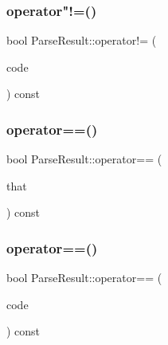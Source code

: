 \mbox{\label{structParseResult_afbe78dd07fd1bc09adb1609dda028ee0}} 
\subsubsection{\texorpdfstring{operator"!=()}{operator!=()}\hspace{0.1cm}{\footnotesize\ttfamily [2/2]}}
{\footnotesize\ttfamily bool Parse\+Result\+::operator!= (\begin{DoxyParamCaption}\item[{\hyperlink{group__RAPIDJSON__ERRORS_ga8d4b32dfc45840bca189ade2bbcb6ba7}{Parse\+Error\+Code}}]{code }\end{DoxyParamCaption}) const\hspace{0.3cm}{\ttfamily [inline]}}

\mbox{\label{structParseResult_a4d98465a5dc6055e367a7ea7089fc73d}} 
\subsubsection{\texorpdfstring{operator==()}{operator==()}\hspace{0.1cm}{\footnotesize\ttfamily [1/2]}}
{\footnotesize\ttfamily bool Parse\+Result\+::operator== (\begin{DoxyParamCaption}\item[{const \hyperlink{structParseResult}{Parse\+Result} \&}]{that }\end{DoxyParamCaption}) const\hspace{0.3cm}{\ttfamily [inline]}}

\mbox{\label{structParseResult_a6de18a7e43013b2defc51d892c2cf90f}} 
\subsubsection{\texorpdfstring{operator==()}{operator==()}\hspace{0.1cm}{\footnotesize\ttfamily [2/2]}}
{\footnotesize\ttfamily bool Parse\+Result\+::operator== (\begin{DoxyParamCaption}\item[{\hyperlink{group__RAPIDJSON__ERRORS_ga8d4b32dfc45840bca189ade2bbcb6ba7}{Parse\+Error\+Code}}]{code }\end{DoxyParamCaption}) const\hspace{0.3cm}{\ttfamily [inline]}}

